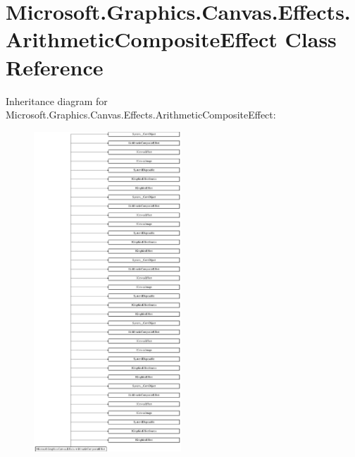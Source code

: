 \hypertarget{class_microsoft_1_1_graphics_1_1_canvas_1_1_effects_1_1_arithmetic_composite_effect}{}\section{Microsoft.\+Graphics.\+Canvas.\+Effects.\+Arithmetic\+Composite\+Effect Class Reference}
\label{class_microsoft_1_1_graphics_1_1_canvas_1_1_effects_1_1_arithmetic_composite_effect}
Inheritance diagram for Microsoft.\+Graphics.\+Canvas.\+Effects.\+Arithmetic\+Composite\+Effect\+:\begin{figure}[H]
\begin{center}
\leavevmode
\includegraphics[height=12.000000cm]{class_microsoft_1_1_graphics_1_1_canvas_1_1_effects_1_1_arithmetic_composite_effect}
\end{center}
\end{figure}
